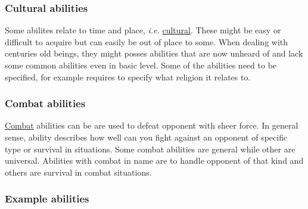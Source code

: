 \subsubsection{Cultural abilities}\label{sssec:era_abilities}
Some abilites relate to time and place, \textit{i.e.} \hyperref[examples_era_abilities]{cultural}.
These might be easy or difficult to acquire but can easily be out of place to some.
When dealing with centuries old beings, they might posses abilities that are now unheard of and lack some common abilities even in basic level.
Some of the abilities need to be specified, for example \textbf{\AbilityNameReligion} requires to specify what religion it relates to.

\subsubsection{Combat abilities}\label{sssec:combat_abilities}
\hyperref[examples_combat_abilities]{Combat} abilities can be are used to defeat opponent with sheer force.
In general sense, ability describes how well can you fight against an opponent of specific type or survival in situations.
Some combat abilities are general while other are universal.
Abilities with combat in name are to handle opponent of that kind and others are survival in combat situations.

\pagebreak
\subsubsection{Example abilities}
\pagebreak

